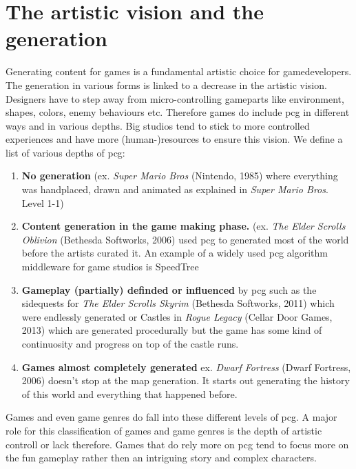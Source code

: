 \documentclass[10pt,a4paper]{article}
\begin{document}
\section{The artistic vision and the generation}\label{sec:visionVSgeneration}
Generating content for games is a fundamental artistic choice for gamedevelopers. The generation in various forms is linked to a decrease in the artistic vision. Designers have to step away from micro-controlling gameparts like environment, shapes, colors, enemy behaviours etc. Therefore games do include \gls{pcg} in different ways and in various depths. Big studios tend to stick to more controlled experiences and have more (human-)resources to ensure this vision. We define a list of various depths of \gls{pcg}:
\begin{enumerate}
\item \textbf{No generation} (ex. \textit{Super Mario Bros} (Nintendo, 1985) where everything was handplaced, drawn and animated as explained in \textit{Super Mario Bros}. Level 1-1\cite{EurogamerMiyamotoInterview})
\item \textbf{Content generation in the game making phase.} (ex. \textit{The Elder Scrolls Oblivion} (Bethesda Softworks, 2006) used \gls{pcg} to generated most of the world before the artists curated it.\cite{PCGamerCarterInterview} An example of a widely used \gls{pcg} algorithm middleware for game studios is SpeedTree\cite{SpeedTree}
\item \textbf{Gameplay (partially) definded or influenced} by \gls{pcg} such as the sidequests for \textit{The Elder Scrolls Skyrim} (Bethesda Softworks, 2011) which were endlessly generated\cite{Bertz2011} or Castles in \textit{Rogue Legacy} (Cellar Door Games, 2013) which are generated procedurally but the game has some kind of continuosity and progress on top of the castle runs.\cite{Stanton2013}
\item \textbf{Games almost completely generated} ex. \textit{Dwarf Fortress} (Dwarf Fortress, 2006) doesn't stop at the map generation. It starts out generating the history of this world and everything that happened before.\cite{Champandard2012}
\end{enumerate}
Games and even game genres do fall into these different levels of \gls{pcg}. A major role for this classification of games and game genres is the depth of artistic controll or lack therefore. Games that do rely more on \gls{pcg} tend to focus more on the fun gameplay rather then an intriguing story and complex characters.
\end{document}
